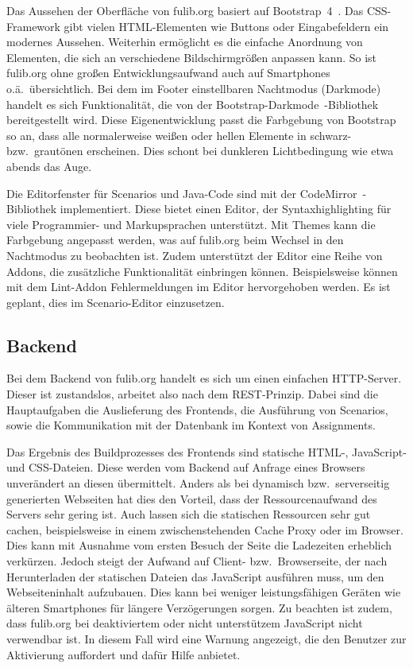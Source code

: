 Das Aussehen der Oberfläche von fulib.org basiert auf Bootstrap~4~\cite{bootstrap}.
Das CSS-Framework gibt vielen HTML-Elementen wie Buttons oder Eingabefeldern ein modernes Aussehen.
Weiterhin ermöglicht es die einfache Anordnung von Elementen, die sich an verschiedene Bildschirmgrößen anpassen kann.
So ist fulib.org ohne großen Entwicklungsaufwand auch auf Smartphones o.ä.\ übersichtlich.
Bei dem im Footer einstellbaren Nachtmodus (Darkmode) handelt es sich Funktionalität,
die von der Bootstrap-Darkmode~\cite{bootstrap-darkmode}-Bibliothek bereitgestellt wird.
Diese Eigenentwicklung passt die Farbgebung von Bootstrap so an, dass alle normalerweise weißen oder hellen Elemente in schwarz- bzw.\ grautönen erscheinen.
Dies schont bei dunkleren Lichtbedingung wie etwa abends das Auge.

Die Editorfenster für Scenarios und Java-Code sind mit der CodeMirror~\cite{codemirror}-Bibliothek implementiert.
Diese bietet einen Editor, der Syntaxhighlighting für viele Programmier- und Markupsprachen unterstützt.
Mit Themes kann die Farbgebung angepasst werden, was auf fulib.org beim Wechsel in den Nachtmodus zu beobachten ist.
Zudem unterstützt der Editor eine Reihe von Addons, die zusätzliche Funktionalität einbringen können.
Beispielsweise können mit dem Lint-Addon Fehlermeldungen im Editor hervorgehoben werden.
Es ist geplant, dies im Scenario-Editor einzusetzen.

\subsection{Backend}\label{subsec:backend}

Bei dem Backend von fulib.org handelt es sich um einen einfachen HTTP-Server.
Dieser ist zustandslos, arbeitet also nach dem REST-Prinzip.
Dabei sind die Hauptaufgaben die Auslieferung des Frontends,
die Ausführung von Scenarios,
sowie die Kommunikation mit der Datenbank im Kontext von Assignments.

Das Ergebnis des Buildprozesses des Frontends sind statische HTML-, JavaScript- und CSS-Dateien.
Diese werden vom Backend auf Anfrage eines Browsers unverändert an diesen übermittelt.
Anders als bei dynamisch bzw.\ serverseitig generierten Webseiten hat dies den Vorteil,
dass der Ressourcenaufwand des Servers sehr gering ist.
Auch lassen sich die statischen Ressourcen sehr gut cachen,
beispielsweise in einem zwischenstehenden Cache Proxy oder im Browser.
Dies kann mit Ausnahme vom ersten Besuch der Seite die Ladezeiten erheblich verkürzen.
Jedoch steigt der Aufwand auf Client- bzw.\ Browserseite,
der nach Herunterladen der statischen Dateien das JavaScript ausführen muss, um den Webseiteninhalt aufzubauen.
Dies kann bei weniger leistungsfähigen Geräten wie älteren Smartphones für längere Verzögerungen sorgen.
Zu beachten ist zudem, dass fulib.org bei deaktiviertem oder nicht unterstützem JavaScript nicht verwendbar ist.
In diesem Fall wird eine Warnung angezeigt, die den Benutzer zur Aktivierung auffordert und dafür Hilfe anbietet.

